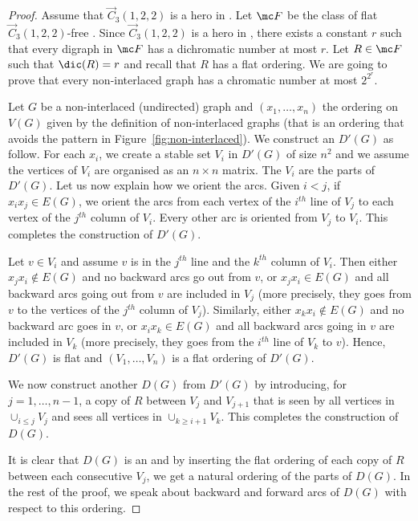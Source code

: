 \begin{proof}

Assume that $\vec C_{3}(1, 2, 2)$ is a hero in \omgs. 
Let $\mc F$ be the class of flat $\vec C_{3}(1, 2, 2)$-free \omgs. 
Since $\vec C_{3}(1, 2, 2)$ is a hero in \omgs, there exists a constant $r$ such that every digraph in $\mc F$ has a dichromatic number at most $r$. Let $R \in \mc F$ such that $\dic(R) = r$ and recall that $R$ has a flat ordering. We are going to prove that every non-interlaced graph has a chromatic number at most $2^{2^r}$. 
    
    
Let $G$ be a non-interlaced (undirected) graph and $(x_1, \dots, x_n)$ the ordering on $V(G)$ given by the definition of non-interlaced graphs (that is an ordering that avoids the pattern in Figure~\ref{fig:non-interlaced}). We construct an \omg  $D'(G)$ as follow. 
 For each $x_i$, we create a stable set $V_i$ in $D'(G)$ of size $n^2$ and we assume the vertices of $V_i$ are organised as an $n \times n$ matrix. The $V_i$ are the parts of $D'(G)$.  Let us now explain how we orient the arcs.  
Given $i<j$, if $x_ix_j \in E(G)$, we orient the arcs from each vertex of the $i^{th}$ line of $V_j$ to each vertex of the $j^{th}$ column of $V_i$.  Every other arc is oriented from $V_j$ to $V_i$. This completes the construction of $D'(G)$. 

Let $v \in V_i$ and assume $v$ is in the $j^{th}$ line and the $k^{th}$ column of $V_i$. 
Then either $x_jx_i \notin E(G)$ and no backward arcs go out from $v$, or $x_jx_i \in E(G)$ and all backward arcs going out from $v$ are included in $V_j$ (more precisely, they goes from $v$ to the vertices of the $j^{th}$ column of $V_j$). Similarly, either $x_kx_i \notin E(G)$ and no backward arc goes in $v$, or $x_ix_k \in E(G)$ and all backward arcs going in $v$ are included in $V_k$ (more precisely, they goes from the $i^{th}$ line of $V_k$ to $v$). Hence, $D'(G)$ is flat and $(V_1,  \dots, V_n)$ is a flat ordering of $D'(G)$. 


We now construct another \omg $D(G)$ from $D'(G)$ by introducing, for $j=1, \dots, n-1$, a copy of $R$ between $V_j$ and $V_{j+1}$ that is seen by all vertices in $\cup_{i\leq j}V_j$ and sees all vertices in $\cup_{k \geq i+1}V_k$. This completes the construction of $D(G)$. 

It is clear that $D(G)$ is an \omg and by inserting the flat ordering of each copy of $R$ between each consecutive $V_j$, we get a natural ordering of the parts of  $D(G)$. 
In the rest of the proof, we speak about backward and forward arcs of $D(G)$ with respect to this ordering. 


\end{proof}
